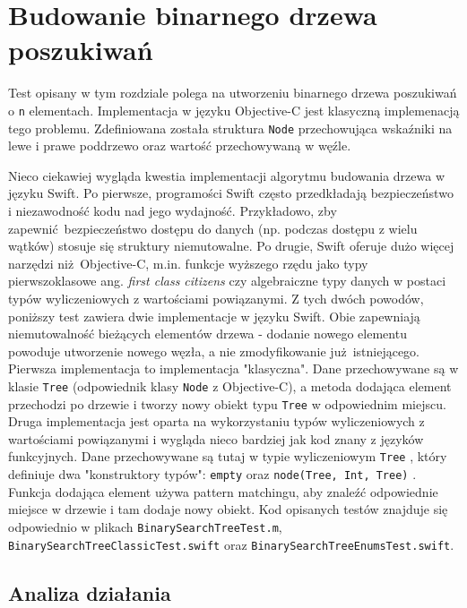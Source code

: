 \documentclass[mgr, shortabstract]{iithesis}
\newcommand{\ang}[1]{ang. \textit{#1}}
\newcommand{\swiftinline}[1]{
    \texttt{#1}
}
\newcommand{\objcinline}[1]{
    \texttt{#1}
}
\begin{document}
\section{Budowanie binarnego drzewa poszukiwań}

Test opisany w tym rozdziale polega na utworzeniu binarnego drzewa poszukiwań o \swiftinline{n} elementach. Implementacja w języku Objective-C jest klasyczną implemenacją tego problemu. Zdefiniowana została struktura \objcinline{Node} przechowująca wskaźniki na lewe i prawe poddrzewo oraz wartość przechowywaną w węźle.

Nieco ciekawiej wygląda kwestia implementacji algorytmu budowania drzewa w języku Swift. Po pierwsze, programości Swift często przedkładają bezpieczeństwo i niezawodność kodu nad jego wydajność. Przykładowo, zby zapewnić bezpieczeństwo dostępu do danych (np. podczas dostępu z wielu wątków) stosuje się struktury niemutowalne. Po drugie, Swift oferuje dużo więcej narzędzi niż Objective-C, m.in. funkcje wyższego rzędu jako typy pierwszoklasowe \ang{first class citizens} czy algebraiczne typy danych w postaci typów wyliczeniowych z wartościami powiązanymi. Z tych dwóch powodów, poniższy test zawiera dwie implementacje w języku Swift. Obie zapewniają niemutowalność bieżących elementów drzewa - dodanie nowego elementu powoduje utworzenie nowego węzła, a nie zmodyfikowanie już istniejącego. Pierwsza implementacja to implementacja "klasyczna". Dane przechowywane są w klasie \swiftinline{Tree} (odpowiednik klasy \objcinline{Node} z Objective-C), a metoda dodająca element przechodzi po drzewie i tworzy nowy obiekt typu \swiftinline{Tree} w odpowiednim miejscu. Druga implementacja jest oparta na wykorzystaniu typów wyliczeniowych z wartościami powiązanymi i wygląda nieco bardziej jak kod znany z języków funkcyjnych. Dane przechowywane są tutaj w typie wyliczeniowym \swiftinline{Tree}, który definiuje dwa "konstruktory typów": \swiftinline{empty} oraz \swiftinline{node(Tree, Int, Tree)}. Funkcja dodająca element używa pattern matchingu, aby znaleźć odpowiednie miejsce w drzewie i tam dodaje nowy obiekt. Kod opisanych testów znajduje się odpowiednio w plikach \texttt{BinarySearchTreeTest.m}, \texttt{BinarySearchTreeClassicTest.swift} oraz \texttt{BinarySearchTreeEnumsTest.swift}.

\subsection{Analiza działania}
\end{document}

